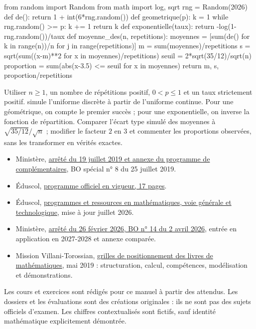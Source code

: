 \begin{python}
from random import Random
from math import log, sqrt
rng = Random(2026)
def de():
    return 1 + int(6*rng.random())
def geometrique(p):
    k = 1
    while rng.random() >= p:
        k += 1
    return k
def exponentielle(taux):
    return -log(1-rng.random())/taux
def moyenne_des(n, repetitions):
    moyennes = [sum(de() for k in range(n))/n
                for j in range(repetitions)]
    m = sum(moyennes)/repetitions
    s = sqrt(sum((x-m)**2 for x in moyennes)/repetitions)
    seuil = 2*sqrt(35/12)/sqrt(n)
    proportion = sum(abs(x-3.5) <= seuil for x in moyennes)
    return m, s, proportion/repetitions
\end{python}
Utiliser $n\geq1$, un nombre de répétitions positif, $0<p\leq1$ et un taux strictement positif.
 simule l'uniforme discrète à partir de l'uniforme continue. Pour une géométrique, on compte le premier succès ; pour une exponentielle, on inverse la fonction de répartition.
Comparer l'écart type simulé des moyennes à $\sqrt{35/12}/\sqrt n$ ; modifier le facteur $2$ en $3$ et commenter les proportions observées, sans les transformer en vérités exactes.
\begin{itemize}
\item Ministère, \href{https://www.education.gouv.fr/bo/19/Special8/MENE1921265A.htm}{arrêté du 19 juillet 2019 et annexe du programme de complémentaires}, BO spécial n° 8 du 25 juillet 2019.
\item Éduscol, \href{https://eduscol.education.gouv.fr/sites/default/files/document/spe265annexe1159134pdf-84162.pdf}{programme officiel en vigueur, 17 pages}.
\item Éduscol, \href{https://eduscol.education.gouv.fr/5817/programmes-et-ressources-en-mathematiques-voie-gt}{programmes et ressources en mathématiques, voie générale et technologique}, mise à jour juillet 2026.
\item Ministère, \href{https://www.education.gouv.fr/bo/2026/Hebdo14/MENE2902920A}{arrêté du 26 février 2026, BO n° 14 du 2 avril 2026}, entrée en application en 2027-2028 et annexe comparée.
\item Mission Villani-Torossian, \href{https://eduscol.education.gouv.fr/sites/default/files/document/grilles-de-positionnement-des-livres-de-mathematiques-70116.pdf}{grilles de positionnement des livres de mathématiques}, mai 2019 : structuration, calcul, compétences, modélisation et démonstrations.
\end{itemize}
Les cours et exercices sont rédigés pour ce manuel à partir des attendus. Les dossiers et les évaluations sont des créations originales : ils ne sont pas des sujets officiels d'examen. Les chiffres contextualisés sont fictifs, sauf identité mathématique explicitement démontrée.
